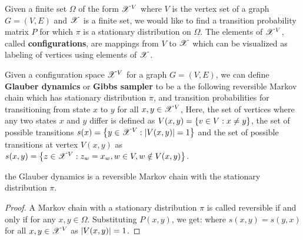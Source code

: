 \documentclass[letterpaper,english,10pt]{article}
\begin{document}
Given a finite set $\Omega$ of the form $\mathscr{X}^V$ where $V$ is the vertex set of a graph $G = (V,E)$ and $\mathscr{X}$ is a finite set, we would like to find a transition probability matrix $P$ for which $\pi$ is a stationary distribution on $\Omega$. The elements of $\mathscr{X}^V$, called \textbf{configurations}, are mappings from $V$ to $\mathscr{X}$ which can be visualized as labeling of vertices using elements of $\mathscr{X}$.
\begin{defn}
Given a configuration space $\mathscr{X}^V$ for a graph $G = (V,E)$, we can define \textbf{Glauber dynamics} or \textbf{Gibbs sampler} to be a the following reversible Markov chain which has stationary distribution $\pi$, 
and transition probabilities for transitioning from state $x$ to $y$ for all ${x,y} \in \mathscr{X}^V$, 
Here, the set of vertices where any two states $x$ and $y$ differ is defined as $V(x,y) = \left\{v \in V: x \neq y\right\}$, the set of possible transitions $s(x) = \left\{y \in \mathscr{X}^V: \left\lvert V(x,y)\right\rvert = 1\right\}$ and the set of possible transitions at vertex $V(x,y)$ as  $s(x,y)= \left\{z \in \mathscr{X}^V: z_w = x_w, w \in V, w \notin V(x,y)\right\}$. 
\end{defn}
\begin{lem}
the Glauber dynamics is a reversible Markov chain with the stationary distribution $\pi$.
\end{lem}
\begin{proof}
A Markov chain with a stationary distribution $\pi$ is called reversible if and only if 
for any $x,y \in \Omega$. Substituting $P(x,y)$, we get:
where $s(x,y) = s(y,x)$ for all $x,y \in \mathscr{X}^V$ as $\left\lvert V(x,y)\right\rvert = 1$. 
\end{proof}
\end{document}
